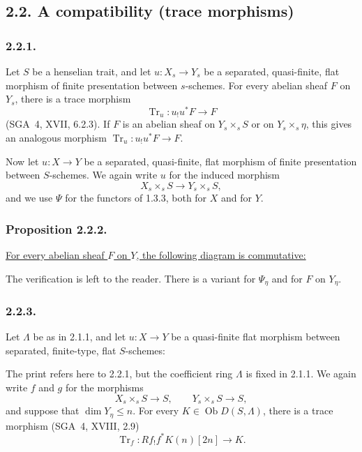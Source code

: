 \subsection*{2.2. A compatibility (trace morphisms)}

\subsubsection*{2.2.1.}
Let $S$ be a henselian trait, and let
$u:X_s\longrightarrow Y_s$ be a separated, quasi-finite, flat
morphism of finite presentation between $s$-schemes.  For every
abelian sheaf $F$ on $Y_s$, there is a trace morphism
\[
\operatorname{Tr}_u:u_!u^*F\longrightarrow F
\]
(SGA~4, XVII, 6.2.3).  If $F$ is an abelian sheaf on
$Y_s\times_sS$ or on $Y_s\times_s\eta$, this gives an analogous
morphism $\operatorname{Tr}_u:u_!u^*F\longrightarrow F$.

Now let $u:X\longrightarrow Y$ be a separated, quasi-finite, flat
morphism of finite presentation between $S$-schemes.  We again write
$u$ for the induced morphism
\[
X_s\times_sS\longrightarrow Y_s\times_sS,
\]
and we use $\Psi$ for the functors of 1.3.3, both for $X$ and for $Y$.

\subsubsection*{Proposition 2.2.2.}
\underline{For every abelian sheaf $F$ on $Y$, the following diagram
is commutative:}
\begin{center}
\end{center}
The verification is left to the reader.  There is a variant for
$\Psi_\eta$ and for $F$ on $Y_\eta$.

\subsubsection*{2.2.3.}
Let $\Lambda$ be as in 2.1.1, and let $u:X\longrightarrow Y$ be a
quasi-finite flat morphism between separated, finite-type, flat
$S$-schemes:
\begin{center}
\end{center}
The print refers here to 2.2.1, but the coefficient ring $\Lambda$ is
fixed in 2.1.1.  We again write $f$ and $g$ for the morphisms
\[
X_s\times_sS\longrightarrow S,
\qquad
Y_s\times_sS\longrightarrow S,
\]
and suppose that $\dim Y_\eta\leq n$.  For every
$K\in\operatorname{Ob}D(S,\Lambda)$, there is a trace morphism
(SGA~4, XVIII, 2.9)
\[
\operatorname{Tr}_f:Rf_!f^*K(n)[2n]\longrightarrow K.
\]


